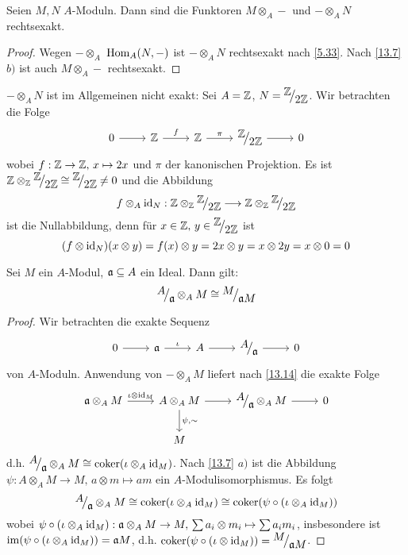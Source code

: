 \begin{fo}\label{13.14}
	Seien $M,N$ $A$-Moduln. Dann sind die Funktoren $M \otimes_A -$ und $-\otimes_A N$ rechtsexakt.
\end{fo}
\begin{proof}
	Wegen $-\otimes_A$  $\operatorname{Hom}_A(N,-)$ ist $-\otimes_A N$ rechtsexakt nach \ref{5.33}. Nach \ref{13.7} $b)$ ist auch $M \otimes_A -$ rechtsexakt.
\end{proof}
\begin{bsp}
	$-\otimes_A N$ ist im Allgemeinen nicht exakt: Sei $A= \mathbb{Z}$, $N = \QR{\Z}{2 \Z}$. Wir betrachten die Folge 
	$$\begin{tikzcd}
	0 \arrow{r} & \Z \arrow{r}{f} & \Z\arrow{r}{\pi} & \QR{\Z}{2\Z} \arrow{r} & 0
	\end{tikzcd}$$
	wobei $f: \mathbb{Z} \to \mathbb{Z}, \, x\mapsto 2x$ und $\pi$ der kanonischen Projektion.
	Es ist $\Z\otimes_\Z\QR{\Z}{2\Z} \cong \QR{\Z}{2\Z} \neq 0$ und die Abbildung
	$$f\otimes_A \id_N : \Z \otimes_\Z \QR{\Z}{2\Z} \longrightarrow \Z \otimes_\Z \QR{\Z}{2\Z}$$
	ist die Nullabbildung, denn für $x\in \Z, \, y\in \QR{\Z}{2\Z}$ ist 
	$$(f \otimes \operatorname{id}_N)(x \otimes y) = f(x) \otimes y = 2x \otimes y = x \otimes 2y = x \otimes 0 = 0$$
\end{bsp}
\begin{bem}\label{13.16}
	Sei $M$ ein $A$-Modul, $\mathfrak{a}\subseteq A$ ein Ideal. Dann gilt:
	$$\QR{A}{\a} \otimes_A M \cong \QR{M}{\a M}$$
\end{bem}
\begin{proof}
	Wir betrachten die exakte Sequenz
	$$\begin{tikzcd}
	0 \arrow{r} & \a \arrow{r}{\iota} & A \arrow{r} & \QR{A}{\a} \arrow{r} & 0 
	\end{tikzcd}$$
	von $A$-Moduln. Anwendung von $-\otimes_AM$ liefert nach \ref{13.14} die exakte Folge 
	$$\begin{tikzcd}
	\a \otimes_A M \arrow{r}{\iota \otimes \id_M} & A\arrow{d}{\psi, \sim} \otimes_AM\arrow{r} & \QR{A }{\a} \otimes_A M \arrow{r} & 0\\
	& M & & 
	\end{tikzcd}$$
	d.h. $\QR{A}{\a} \otimes_AM\cong \coker(\iota\otimes_A \id_M)$. Nach \ref{13.7} $a)$ ist die Abbildung $\psi:A \otimes_A M \to M,\, a \otimes m \mapsto am$ ein $A$-Modulisomorphismus. Es folgt 
	$$\QR{A}{\a} \otimes_A M \cong \coker(\iota\otimes_A \id_M) \cong \coker(\psi\circ (\iota \otimes_A \id_M))$$
	wobei $\psi \circ(\iota\otimes_A \operatorname{id}_M) : \mathfrak{a} \otimes_A M \to M, \, \sum a_i \otimes m_i \mapsto \sum a_i m_i$, insbesondere ist $\operatorname{im}(\psi \circ (\iota \otimes_A \operatorname{id}_M)) = \mathfrak{a} M$, d.h. $\coker(\psi \circ (\iota \otimes \id_M)) = \QR{M}{\a M}$.
\end{proof}
